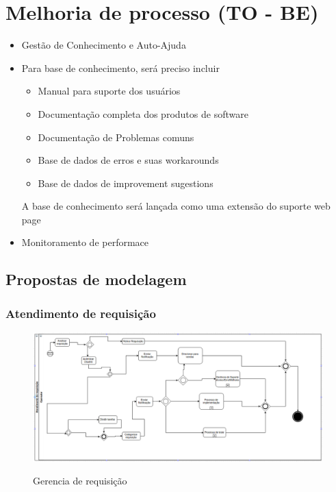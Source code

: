 \section{ Melhoria de processo (TO - BE)}

\begin{itemize}[noitemsep]
	\item Gestão de Conhecimento e Auto-Ajuda
	\item	Para base de conhecimento, será preciso incluir
	\begin{itemize}[noitemsep]
		\item Manual para suporte dos usuários
		\item Documentação completa dos produtos de software
		\item Documentação de Problemas comuns
		\item Base de dados de erros e suas workarounds
		\item Base de dados de improvement sugestions
	\end{itemize}
	A base de conhecimento será lançada como uma extensão do
	suporte web page
	\item Monitoramento de performace
\end{itemize}




\subsection{Propostas de modelagem}
\subsubsection{Atendimento de requisição }
\begin{figure}[!h]
\caption{Gerencia de requisição}
\centering %
\includegraphics[width=15cm]{to_be/01_atendimento_de_requisicao.png}
\label{figura:atendimento_requisicao_to_be}
\end{figure}

